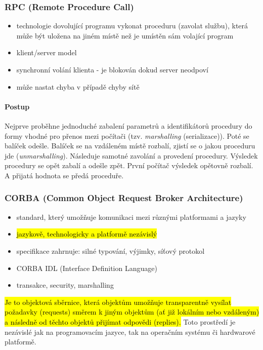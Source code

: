 \subsubsection*{RPC (Remote Procedure Call)}
\begin{itemize}[itemsep=0px]
\item technologie dovolující programu vykonat proceduru (zavolat službu), která může být uložena na jiném místě než je umístěn sám volající program
\item klient/server model
\item synchronní volání klienta - je blokován dokud server neodpoví
\item může nastat chyba v případě chyby sítě
\end{itemize}

\paragraph{Postup} Nejprve proběhne jednoduché zabalení parametrů a identifikátorů procedury do formy vhodné pro přenos mezi počítači (tzv. \textit{marshalling} (serializace)). Poté se balíček odešle. Balíček se na vzdáleném místě rozbalí, zjistí se o jakou proceduru jde (\textit{unmarshalling}). Následuje samotné zavolání a provedení procedury. Výsledek procedury se opět zabalí a odešle zpět. První počítač výsledek opětovně rozbalí. A přijatá hodnota se předá proceduře.

\subsubsection*{CORBA (Common Object Request Broker Architecture)}
\begin{itemize}[itemsep=0px]
\item standard, který umožňuje komunikaci mezi různými platformami a jazyky
\item \hl{jazykově, technologicky a platformě nezávislý}
\item specifikace zahrnuje: silné typování, výjimky, síťový protokol
\item CORBA IDL (Interface Definition Language)
\item transakce, security, marshalling
\end{itemize}

\hl{Je to objektová sběrnice, která objektům umožňuje transparentně vysílat požadavky (requests) směrem k jiným objektům (ať již lokálním nebo vzdáleným) a následně od těchto objektů přijímat odpovědi (replies).} Toto prostředí je nezávislé jak na programovacím jazyce, tak na operačním systému či hardwarové  platformě.

